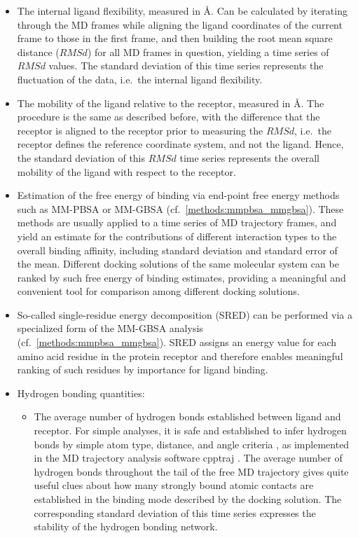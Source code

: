 \begin{itemize}
\item The internal ligand flexibility, measured in \si{\angstrom}. Can be
calculated by iterating through the MD frames while aligning the ligand
coordinates of the current frame to those in the first frame, and then building
the root mean square distance ($RMSd$) for all MD frames in question,
yielding a time series of $RMSd$ values. The standard deviation of this time
series represents the fluctuation of the data, i.e.\ the internal ligand
flexibility.

\item The mobility of the ligand relative to the receptor, measured in
\si{\angstrom}. The procedure is the same as described before, with the
difference that the receptor is aligned to the receptor prior to measuring the
$RMSd$, i.e.\ the receptor defines the reference coordinate system, and not the
ligand. Hence, the standard deviation of this $RMSd$ time series represents the
overall mobility of the ligand with respect to the receptor.

\item Estimation of the free energy of binding via end-point free energy methods
such as MM-PBSA or MM-GBSA (cf.\ \cref{methods:mmpbsa_mmgbsa}). These methods
are usually applied to a time series of MD trajectory frames, and yield an
estimate for the contributions of different interaction types to the overall
binding affinity, including standard deviation and standard error of the mean.
Different docking solutions of the same molecular system can be ranked by such
free energy of binding estimates, providing a meaningful and convenient tool for
comparison among different docking solutions.

\item So-called single-residue energy decomposition (SRED) can be performed via
a specialized form of the MM-GBSA analysis (cf.\ \cref{methods:mmpbsa_mmgbsa}).
SRED assigns an energy value for each amino acid residue in the protein receptor
and therefore enables meaningful ranking of such residues by importance for
ligand binding.

\item Hydrogen bonding quantities:
\begin{itemize}
\item The average number of hydrogen bonds established between ligand and
receptor. For simple analyses, it is safe and established to infer hydrogen
bonds by simple atom type, distance, and angle criteria
\cite{hbonds_crystal_survey,hbonds_sulfur_1991}, as implemented in the MD
trajectory analysis software cpptraj \cite{cpptraj_2013}. The average number of
hydrogen bonds throughout the tail of the free MD trajectory gives quite useful
clues about how many strongly bound atomic contacts are established in the
binding mode described by the docking solution. The corresponding standard
deviation of this time series expresses the stability of the hydrogen bonding
network.


\end{itemize}
\end{itemize}
